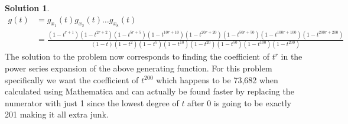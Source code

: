 \documentclass[12pt, letterpaper, onecolumn, conference, final]{IEEEtran}
\theoremstyle{definition}
\newtheorem*{solution*}{Solution}
\theoremstyle{plain}
\begin{document}
\begin{solution*}
\begin{equation*}
\begin{split}
g(t) &= g_{x_1}(t)g_{x_2}(t)\dots g_{x_8}(t) \\
&= \frac{(1-t^{r+1})(1-t^{2r+2})(1-t^{5r+5})(1-t^{10r+10})(1-t^{20r+20})(1-t^{50r+50})(1-t^{100r+100})(1-t^{200r+200})}{(1-t)(1-t^2)(1-t^5)(1-t^{10})(1-t^{20})(1-t^{50})(1-t^{100})(1-t^{200})}
\end{split}
\end{equation*}
The solution to the problem now corresponds to finding the coefficient of $t^r$ in the power series expansion of the above generating function. For this problem specifically we want the coefficient of $t^{200}$ which happens to be 73,682 when calculated using Mathematica and can actually be found faster by replacing the numerator with just 1 since the lowest degree of $t$ after 0 is going to be exactly 201 making it all extra junk.
\end{solution*}
\end{document}
